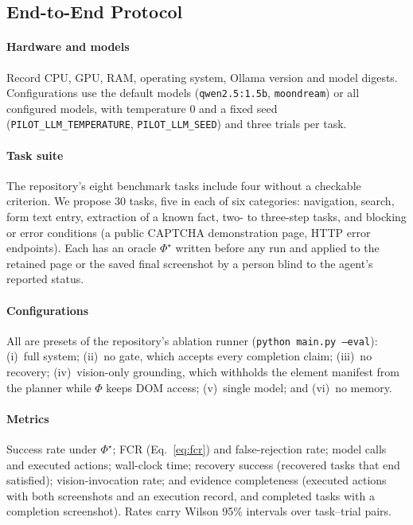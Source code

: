 \subsection{End-to-End Protocol}

\paragraph{Hardware and models} Record CPU, GPU, RAM, operating system, Ollama version and model digests. Configurations use the default models (\texttt{qwen2.5:1.5b}, \texttt{moondream}) or all configured models, with temperature 0 and a fixed seed (\texttt{PILOT\_LLM\_TEMPERATURE}, \texttt{PILOT\_LLM\_SEED}) and three trials per task. 

\paragraph{Task suite} The repository's eight benchmark tasks include four without a checkable criterion. We propose 30 tasks, five in each of six categories: navigation, search, form text entry, extraction of a known fact, two- to three-step tasks, and blocking or error conditions (a public CAPTCHA demonstration page, HTTP error endpoints). Each has an oracle $\Phi^{\star}$ written before any run and applied to the retained page or the saved final screenshot by a person blind to the agent's reported status. 

\paragraph{Configurations} All are presets of the repository's ablation runner (\texttt{python main.py --eval}): (i)~full system; (ii)~no gate, which accepts every completion claim; (iii)~no recovery; (iv)~vision-only grounding, which withholds the element manifest from the planner while $\Phi$ keeps DOM access; (v)~single model; and (vi)~no memory.

\paragraph{Metrics} Success rate under $\Phi^{\star}$; FCR (Eq.~\ref{eq:fcr}) and false-rejection rate; model calls and executed actions; wall-clock time; recovery success (recovered tasks that end satisfied); vision-invocation rate; and evidence completeness (executed actions with both screenshots and an execution record, and completed tasks with a completion screenshot). Rates carry Wilson 95\% intervals over task--trial pairs.
